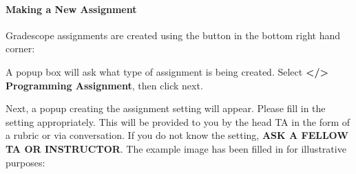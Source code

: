 \documentclass[
]{article}
\begin{document}
\hypertarget{making-a-new-assignment}{%
\paragraph{Making a New Assignment}\label{making-a-new-assignment}}

Gradescope assignments are created using the button in the bottom right
hand corner:

\begin{center}
\end{center}

A popup box will ask what type of assignment is being created. Select
\textbf{\textless/\textgreater{} Programming Assignment}, then click
next.

Next, a popup creating the assignment setting will appear. Please fill
in the setting appropriately. This will be provided to you by the head
TA in the form of a rubric or via conversation. If you do not know the
setting, \textbf{ASK A FELLOW TA OR INSTRUCTOR}. The example image has
been filled in for illustrative purposes:

\begin{center}
\end{center}
\end{document}
